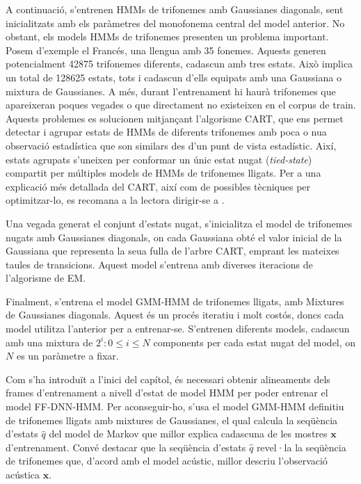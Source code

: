 A continuació, s'entrenen HMMs de trifonemes amb Gaussianes diagonals, sent inicialitzats amb els paràmetres del monofonema central del model anterior.
No obstant, els models HMMs de trifonemes presenten un problema important. Posem d'exemple el Francés, una llengua amb 35 fonemes. Aquests generen potencialment 42875 trifonemes diferents, cadascun amb tres estats. Això implica un total de 128625 estats, tots i cadascun d'ells equipats amb una Gaussiana o mixtura de Gaussianes. A més, durant l'entrenament hi haurà trifonemes que apareixeran poques vegades o que directament no existeixen en el corpus de train.
Aquests problemes es solucionen mitjançant l'algorisme CART, que ens permet detectar i agrupar estats de HMMs de diferents trifonemes amb poca o nu\lgem a observació estadística que son similars des d'un punt de vista estadístic. Així, estats agrupats s'uneixen per conformar un únic estat nugat (\textit{tied-state}) compartit per múltiples models de HMMs de trifonemes lligats.
Per a una explicació més detallada del CART, així com de possibles tècniques per optimitzar-lo, es recomana a la lectora dirigir-se a \cite[cap. 18.1]{pml1Book}.

Una vegada generat el conjunt d'estats nugat, s'inicialitza el model de trifonemes nugats amb Gaussianes diagonals, on cada Gaussiana obté el valor inicial de la Gaussiana que representa la seua fulla de l'arbre CART, emprant les mateixes taules de transicions. Aquest model s'entrena amb diverses iteracions de l'algorisme de EM.

Finalment, s'entrena el model GMM-HMM de trifonemes lligats, amb Mixtures de Gaussianes diagonals. Aquest és un procés iteratiu i molt costós, doncs cada model utilitza l'anterior per a entrenar-se. S'entrenen diferents models, cadascun amb una mixtura de $2^i : 0 \le i \le N$ components per cada estat nugat del model, on $N$ es un paràmetre a fixar.

Com s'ha introduït a l'inici del capítol, és necessari obtenir alineaments dels frames d'entrenament a nivell d'estat de model HMM per poder entrenar el model FF-DNN-HMM. 
Per aconseguir-ho, s'usa el model GMM-HMM definitiu de trifonemes lligats amb mixtures de Gaussianes, el qual calcula la seqüència d'estats $\hat{q}$ del model de Markov que millor explica cadascuna de les mostres $\textbf{x}$ d'entrenament. Convé destacar que la seqüència d'estats $\hat{q}$ revel·la la seqüència de trifonemes que, d'acord amb el model acústic, millor descriu l'observació acústica $\textbf{x}$.

